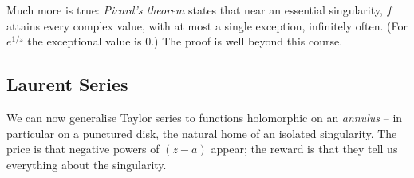 \begin{remark}
    Much more is true: \emph{Picard's theorem} states that near an essential singularity, $f$ attains every complex value, with at most a single exception, infinitely often. (For $e^{1/z}$ the exceptional value is $0$.) The proof is well beyond this course.
\end{remark}

\subsection{Laurent Series}

We can now generalise Taylor series to functions holomorphic on an \emph{annulus} -- in particular on a punctured disk, the natural home of an isolated singularity. The price is that negative powers of $(z - a)$ appear; the reward is that they tell us everything about the singularity.

\begin{center}
\end{center}

